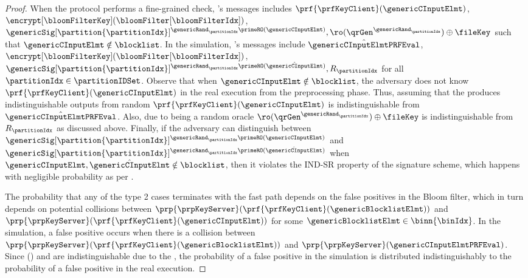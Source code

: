 \begin{proof}
When the protocol performs a fine-grained check, \server's messages includes $ \prf{\prfKeyClient}(\genericCInputElmt)$, $\encrypt[\bloomFilterKey](\bloomFilter[\bloomFilterIdx])$, $\genericSig[\partition{\partitionIdx}]^{\genericRand_\partitionIdx \primeRO(\genericCInputElmt)}, \ro(\qrGen^{\genericRand_\partitionIdx}) \oplus \fileKey$ such that $\genericCInputElmt \notin \blocklist$. In the
simulation, \server's messages include $\hat{\genericCInputElmtPRFEval}$, $\encrypt[\bloomFilterKey](\bloomFilter[\bloomFilterIdx])$, $\genericSig[\partition{\partitionIdx}]^{\genericRand_\partitionIdx \primeRO(\hat{\genericCInputElmt})}, R_\partitionIdx$ for all $\partitionIdx \in \partitionIDSet$. Observe that when $\genericCInputElmt \notin \blocklist$, the adversary does not know $\prf{\prfKeyClient}(\genericCInputElmt)$ in the real execution from the preprocessing phase. Thus, assuming that the \prf produces indistinguishable outputs from random $\prf{\prfKeyClient}(\genericCInputElmt)$ is indistinguishable from $\hat{\genericCInputElmtPRFEval}$. Also, due to \ro being a random oracle $\ro(\qrGen^{\genericRand_\partitionIdx}) \oplus \fileKey$ is indistinguishable from $R_\partitionIdx$ as discussed above. Finally, if the adversary can distinguish between $\genericSig[\partition{\partitionIdx}]^{\genericRand_\partitionIdx \primeRO(\genericCInputElmt)}$ and $\genericSig[\partition{\partitionIdx}]^{\genericRand_\partitionIdx \primeRO(\hat{\genericCInputElmt})}$ when $\genericCInputElmt, \hat{\genericCInputElmt} \notin \blocklist$, then it violates the IND-SR property of the signature scheme, which happens with negligible probability as per . 

The probability that any of the type 2 cases terminates with the fast path depends on the false positives in the Bloom filter, which in turn depends on potential collisions between $\prp{\prpKeyServer}(\prf{\prfKeyClient}(\genericBlocklistElmt))$ and $\prp{\prpKeyServer}(\prf{\prfKeyClient}(\genericCInputElmt))$ for some $\genericBlocklistElmt \in \binn{\binIdx}$. In the simulation, a false positive occurs when there is a collision between  $\prp{\prpKeyServer}(\prf{\prfKeyClient}(\genericBlocklistElmt))$ and $\prp{\prpKeyServer}(\genericCInputElmtPRFEval)$. Since \prf{\prfKeyClient}(\genericBlocklistElmt) and \genericCInputElmtPRFEval are indistinguishable due to the \prf, the probability of a false positive in the simulation is distributed indistinguishably to the probability of a false positive in the real execution. 
\end{proof}
